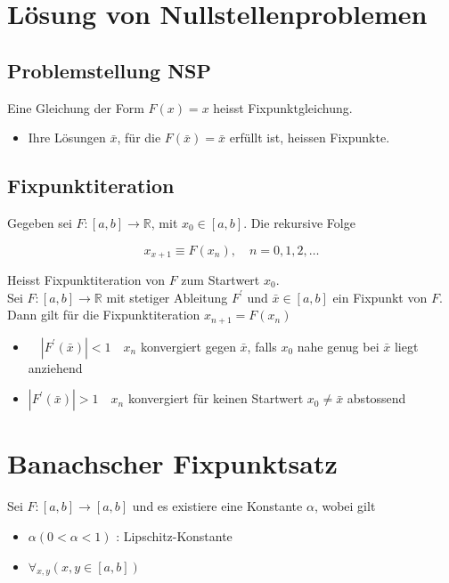 \section{Lösung von Nullstellenproblemen}

\subsection{Problemstellung NSP}

Eine Gleichung der Form $F(x)=x$ heisst Fixpunktgleichung.

\begin{itemize}
  \item Ihre Lösungen $\bar{x}$, für die $F(\bar{x})=\bar{x}$ erfüllt ist, heissen Fixpunkte.
\end{itemize}

\subsection{Fixpunktiteration}

Gegeben sei $F:[a, b] \rightarrow \mathbb{R}$, mit $x_{0} \in[a, b]$. Die rekursive Folge

$$
x_{x+1} \equiv F\left(x_{n}\right), \quad n=0,1,2, \ldots
$$

Heisst Fixpunktiteration von $F$ zum Startwert $x_{0}$.\\
Sei $F:[a, b] \rightarrow \mathbb{R}$ mit stetiger Ableitung $F^{\prime}$ und $\bar{x} \in[a, b]$ ein Fixpunkt von $F$. Dann gilt für die Fixpunktiteration $x_{n+1}=F\left(x_{n}\right)$

\begin{itemize}
  \item $\quad\left|F^{\prime}(\bar{x})\right|<1 \quad x_{n}$ konvergiert gegen $\bar{x}$, falls $x_{0}$ nahe genug bei $\bar{x}$ liegt anziehend
  \item $\left|F^{\prime}(\bar{x})\right|>1 \quad x_{n}$ konvergiert für keinen Startwert $x_{0} \neq \bar{x}$ abstossend
\end{itemize}

\section*{Banachscher Fixpunktsatz}
Sei $F:[a, b] \rightarrow[a, b]$ und es existiere eine Konstante $\alpha$, wobei gilt

\begin{itemize}
  \item $\alpha(0<\alpha<1)$ : Lipschitz-Konstante
  \item $\forall_{x, y}(x, y \in[a, b])$
\end{itemize}

